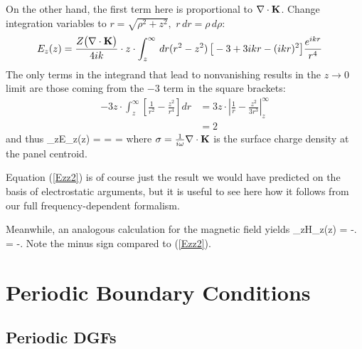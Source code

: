 \documentclass[letterpaper]{article}
\begin{document}
On the other hand, the first term here is proportional to $\nabla \cdot \mathbf{K}$.
Change integration variables to 
$r=\sqrt{\rho^2 + z^2}, \,\, r\,dr = \rho\, d\rho:$
\begin{align*}
 E_z(z) 
&= \frac{Z \big (\nabla \cdot \mathbf{K} \big)}{4ik} 
   \cdot z \cdot \int_z^\infty \, dr (r^2 - z^2) \, \big[-3 + 3ikr - (ikr)^2\big] 
   \frac{e^{ikr}}{r^4}
\end{align*}
The only terms in the integrand that lead to nonvanishing results in the 
$z\to 0$ limit are those coming from the $-3$ term in the square brackets:
\begin{align*}
 -3z\cdot \int_z^\infty \left[ \frac{1}{r^2} - \frac{z^2}{r^4} \right]dr 
&=
  3z\cdot\left| \frac{1}{r} - \frac{z^2}{3r^3} \right|_{z}^\infty
\\
&=2
\end{align*}
and thus 
{
   \lim_{z}E_z(z) 
   =  
   =  
   = \frac{\sigma}{2\epsilon}
}
where $\sigma=\frac{1}{i\omega}\nabla \cdot \mathbf{K}$ is 
the surface charge density at the panel centroid. 

Equation (\ref{Ezz2}) is of course just the result we 
would have predicted on the basis of electrostatic 
arguments, but it is useful to see here how it follows 
from our full frequency-dependent formalism.

Meanwhile, an analogous calculation for the magnetic field yields
{\lim_{z}H_z(z) 
   = -.
   = -.
}
Note the minus sign compared to (\ref{Ezz2}).

\newpage
\newcommand{\GBar}{\overline{\vb G}}
\newcommand{\CBar}{\overline{\vb C}}

\section{Periodic Boundary Conditions}

\subsection{Periodic DGFs}
\end{document}
